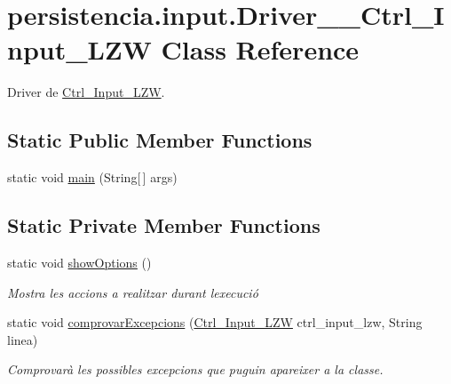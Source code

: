 \hypertarget{classpersistencia_1_1input_1_1Driver____Ctrl__Input__LZW}{}\section{persistencia.\+input.\+Driver\+\_\+\+\_\+\+Ctrl\+\_\+\+Input\+\_\+\+L\+ZW Class Reference}
\label{classpersistencia_1_1input_1_1Driver____Ctrl__Input__LZW}


Driver de \hyperlink{classpersistencia_1_1input_1_1Ctrl__Input__LZW}{Ctrl\+\_\+\+Input\+\_\+\+L\+ZW}.  


\subsection*{Static Public Member Functions}
\begin{DoxyCompactItemize}
\item 
static void \hyperlink{classpersistencia_1_1input_1_1Driver____Ctrl__Input__LZW_a157252ceaf7ec257685654b5ad78049f}{main} (String\mbox{[}$\,$\mbox{]} args)
\end{DoxyCompactItemize}
\subsection*{Static Private Member Functions}
\begin{DoxyCompactItemize}
\item 
static void \hyperlink{classpersistencia_1_1input_1_1Driver____Ctrl__Input__LZW_a6b5f6f40be349f75d3ac91ecfb453088}{show\+Options} ()
\begin{DoxyCompactList}\small\item\em Mostra les accions a realitzar durant l\textquotesingle{}execució \end{DoxyCompactList}\item 
static void \hyperlink{classpersistencia_1_1input_1_1Driver____Ctrl__Input__LZW_a86e186fca84cfae1f5a019b4853a0902}{comprovar\+Excepcions} (\hyperlink{classpersistencia_1_1input_1_1Ctrl__Input__LZW}{Ctrl\+\_\+\+Input\+\_\+\+L\+ZW} ctrl\+\_\+input\+\_\+lzw, String linea)
\begin{DoxyCompactList}\small\item\em Comprovarà les possibles excepcions que puguin apareixer a la classe. \end{DoxyCompactList}\end{DoxyCompactItemize}


